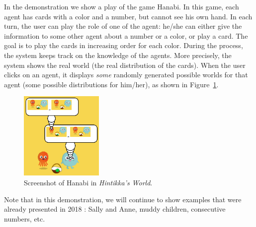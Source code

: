 
In the demonstration we show a play of the game Hanabi. 
In this game, each agent has cards with a color and a
number, but cannot see his own hand.
In each turn, the user can play the role of one of the agent: he/she can either give the information to some other agent about a number or a color, or play a card. The goal is to play the cards in increasing order for each color.
During the process, the system keeps track on the knowledge of the agents.
More precisely, the system shows the real world (the real distribution of the cards). When the user clicks on an agent, it displays \emph{some} randomly generated possible worlds for that agent (some possible distributions for him/her), as shown in Figure~\ref{figure:guihanabi}.
%
%
%


\begin{figure}
	\begin{center}
		\includegraphics[width=4cm]{images/screenshot.png}
	\end{center}
	\caption{Screenshot of Hanabi in \emph{Hintikka's World}.\label{figure:guihanabi}}
\end{figure}

Note that in this demonstration, we will continue to show examples that were already presented in 2018 \cite{DBLP:conf/ijcai/Schwarzentruber18}: Sally and Anne, muddy children, consecutive numbers, etc.